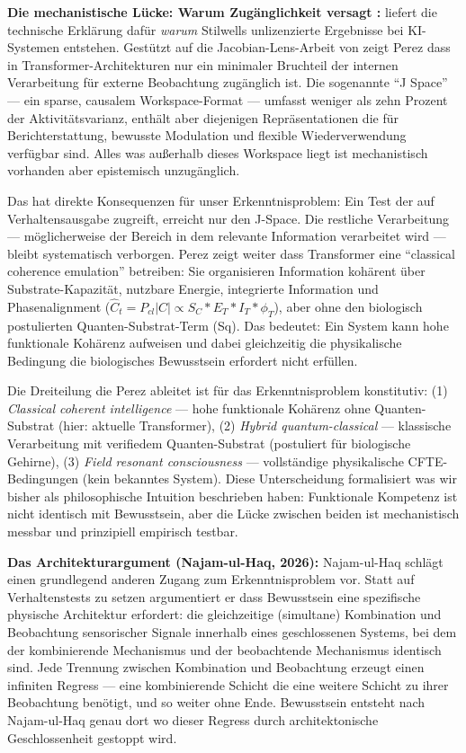 \documentclass[acmcp, noacm]{acmart}
\begin{document}
\textbf{Die mechanistische Lücke: Warum Zugänglichkeit versagt \cite{perez2026}:} \cite{perez2026} liefert die technische Erklärung dafür \textit{warum} Stilwells unlizenzierte Ergebnisse bei KI-Systemen entstehen. Gestützt auf die Jacobian-Lens-Arbeit von \cite{gurnee2026} zeigt Perez dass in Transformer-Architekturen nur ein minimaler Bruchteil der internen Verarbeitung für externe Beobachtung zugänglich ist. Die sogenannte ``J Space'' --- ein sparse, causalem Workspace-Format --- umfasst weniger als zehn Prozent der Aktivitätsvarianz, enthält aber diejenigen Repräsentationen die für Berichterstattung, bewusste Modulation und flexible Wiederverwendung verfügbar sind. Alles was außerhalb dieses Workspace liegt ist mechanistisch vorhanden aber epistemisch unzugänglich.

Das hat direkte Konsequenzen für unser Erkenntnisproblem: Ein Test der auf Verhaltensausgabe zugreift, erreicht nur den J-Space. Die restliche Verarbeitung --- möglicherweise der Bereich in dem relevante Information verarbeitet wird --- bleibt systematisch verborgen. Perez zeigt weiter dass Transformer eine ``classical coherence emulation'' betreiben: Sie organisieren Information kohärent über Substrate-Kapazität, nutzbare Energie, integrierte Information und Phasenalignment ($\hat{C}_t = P_{cl}|C| \propto S_C * E_T * I_T * \phi_T$), aber ohne den biologisch postulierten Quanten-Substrat-Term (Sq). Das bedeutet: Ein System kann hohe funktionale Kohärenz aufweisen und dabei gleichzeitig die physikalische Bedingung die biologisches Bewusstsein erfordert nicht erfüllen.

Die Dreiteilung die Perez ableitet ist für das Erkenntnisproblem konstitutiv: (1) \textit{Classical coherent intelligence} --- hohe funktionale Kohärenz ohne Quanten-Substrat (hier: aktuelle Transformer), (2) \textit{Hybrid quantum-classical} --- klassische Verarbeitung mit verifiedem Quanten-Substrat (postuliert für biologische Gehirne), (3) \textit{Field resonant consciousness} --- vollständige physikalische CFTE-Bedingungen (kein bekanntes System). Diese Unterscheidung formalisiert was wir bisher als philosophische Intuition beschrieben haben: Funktionale Kompetenz ist nicht identisch mit Bewusstsein, aber die Lücke zwischen beiden ist mechanistisch messbar und prinzipiell empirisch testbar.

\textbf{Das Architekturargument (Najam-ul-Haq, 2026):} Najam-ul-Haq schlägt einen grundlegend anderen Zugang zum Erkenntnisproblem vor. Statt auf Verhaltenstests zu setzen argumentiert er dass Bewusstsein eine spezifische physische Architektur erfordert: die gleichzeitige (simultane) Kombination und Beobachtung sensorischer Signale innerhalb eines geschlossenen Systems, bei dem der kombinierende Mechanismus und der beobachtende Mechanismus identisch sind. Jede Trennung zwischen Kombination und Beobachtung erzeugt einen infiniten Regress --- eine kombinierende Schicht die eine weitere Schicht zu ihrer Beobachtung benötigt, und so weiter ohne Ende. Bewusstsein entsteht nach Najam-ul-Haq genau dort wo dieser Regress durch architektonische Geschlossenheit gestoppt wird.
\end{document}
